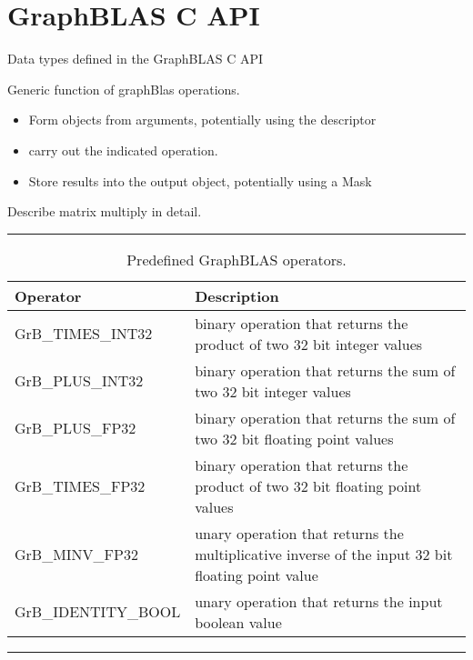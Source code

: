 \section{GraphBLAS C API}
\label{sec:Capi}
Data types defined in the GraphBLAS C API

Generic function of graphBlas operations.
\begin{itemize}
\item Form objects from arguments, potentially using the descriptor
\item carry out the indicated operation.
\item Store results into the output object, potentially using a Mask
\end{itemize}
Describe matrix multiply in detail.  

\begin{table*}[h]
\hrule
\begin{center}
\caption{Predefined GraphBLAS operators.}
\label{Tab:GrBops}
\begin{tabular}{ll}
Operator                          & Description  \\
\hline
GrB\_TIMES\_INT32       & binary operation that returns the product of two 32 bit integer values \\
GrB\_PLUS\_INT32         & binary operation that returns the sum of two 32 bit integer values \\
GrB\_PLUS\_FP32          & binary operation that returns the sum of two 32 bit floating point values \\
GrB\_TIMES\_FP32        & binary operation that returns the product of two 32 bit floating point values \\
GrB\_MINV\_FP32          & unary operation that returns the multiplicative inverse of the input 32 bit floating point value \\
GrB\_IDENTITY\_BOOL  & unary operation that returns the input boolean value \\
\end{tabular}
\end{center}
\hrule
\end{table*}

